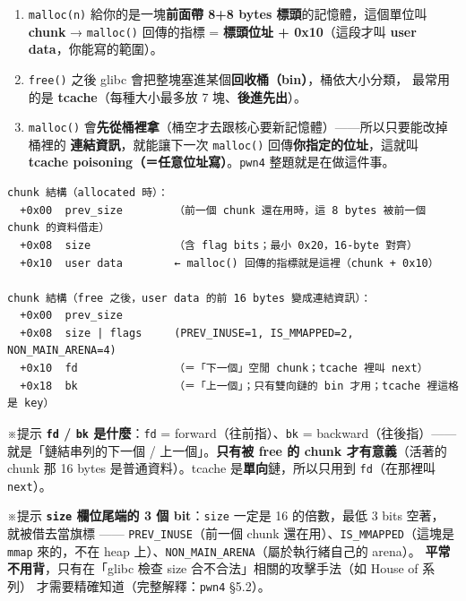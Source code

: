 \documentclass[10pt,a4paper]{article}
\providecommand{\tightlist}{%
  \setlength{\itemsep}{0pt}\setlength{\parskip}{0pt}}
\renewenvironment{quote}{%
  \begin{mdframed}[linewidth=0pt,innerleftmargin=0pt,innerrightmargin=0pt,
    innerbottommargin=0pt,innertopmargin=0pt,skipabove=0.55em,skipbelow=0.55em,
    leftmargin=0.9em,rightmargin=0.4em,startcode={\color{quotebar}\vrule width 2.6pt},%
    endcode={}]%
  \itshape\color{black}%
}{%
  \end{mdframed}%
}
\begin{document}
\begin{enumerate}
\def\labelenumi{\arabic{enumi}.}
\tightlist
\item
  \texttt{malloc(n)} 給你的是一塊\textbf{前面帶 8+8 bytes
  標頭}的記憶體，這個單位叫 \textbf{chunk} → \texttt{malloc()}
  回傳的指標 = \textbf{標頭位址 + 0x10}（這段才叫 \textbf{user
  data}，你能寫的範圍）。
\item
  \texttt{free()} 之後 glibc
  會把整塊塞進某個\textbf{回收桶（bin）}，桶依大小分類， 最常用的是
  \textbf{tcache}（每種大小最多放 7 塊、\textbf{後進先出}）。
\item
  \texttt{malloc()}
  會\textbf{先從桶裡拿}（桶空才去跟核心要新記憶體）------所以只要能改掉桶裡的
  \textbf{連結資訊}，就能讓下一次 \texttt{malloc()}
  回傳\textbf{你指定的位址}，這就叫 \textbf{tcache
  poisoning（＝任意位址寫）}。\texttt{pwn4} 整題就是在做這件事。
\end{enumerate}

\begin{Verbatim}[breaklines=true,breakanywhere=true,breakautoindent=false,fontsize=\fontsize{7.0}{9.5}\selectfont]
chunk 結構（allocated 時）：
  +0x00  prev_size        （前一個 chunk 還在用時，這 8 bytes 被前一個 chunk 的資料借走）
  +0x08  size             （含 flag bits；最小 0x20，16-byte 對齊）
  +0x10  user data        ← malloc() 回傳的指標就是這裡（chunk + 0x10）

chunk 結構（free 之後，user data 的前 16 bytes 變成連結資訊）：
  +0x00  prev_size
  +0x08  size | flags     (PREV_INUSE=1, IS_MMAPPED=2, NON_MAIN_ARENA=4)
  +0x10  fd               （＝「下一個」空閒 chunk；tcache 裡叫 next）
  +0x18  bk               （＝「上一個」；只有雙向鏈的 bin 才用；tcache 裡這格是 key）
\end{Verbatim}

\begin{quote}
※提示 \textbf{\texttt{fd} / \texttt{bk} 是什麼}：\texttt{fd} =
forward（往前指）、\texttt{bk} = backward（往後指）------
就是「鏈結串列的下一個 / 上一個」。\textbf{只有被 free 的 chunk
才有意義}（活著的 chunk 那 16 bytes 是普通資料）。tcache
是\textbf{單向}鏈，所以只用到 \texttt{fd}（在那裡叫 \texttt{next}）。
\end{quote}

\begin{quote}
※提示 \textbf{\texttt{size} 欄位尾端的 3 個 bit}：\texttt{size} 一定是
16 的倍數，最低 3 bits 空著， 就被借去當旗標 ------
\texttt{PREV\_\allowbreak{}INUSE}（前一個 chunk
還在用）、\texttt{IS\_\allowbreak{}MMAPPED}（這塊是 \texttt{mmap} 來的，不在 heap
上）、\texttt{NON\_\allowbreak{}MAIN\_\allowbreak{}ARENA}（屬於執行緒自己的 arena）。
\textbf{平常不用背}，只有在「glibc 檢查 size
合不合法」相關的攻擊手法（如 House of 系列）
才需要精確知道（完整解釋：\texttt{pwn4} §5.2）。
\end{quote}
\end{document}

